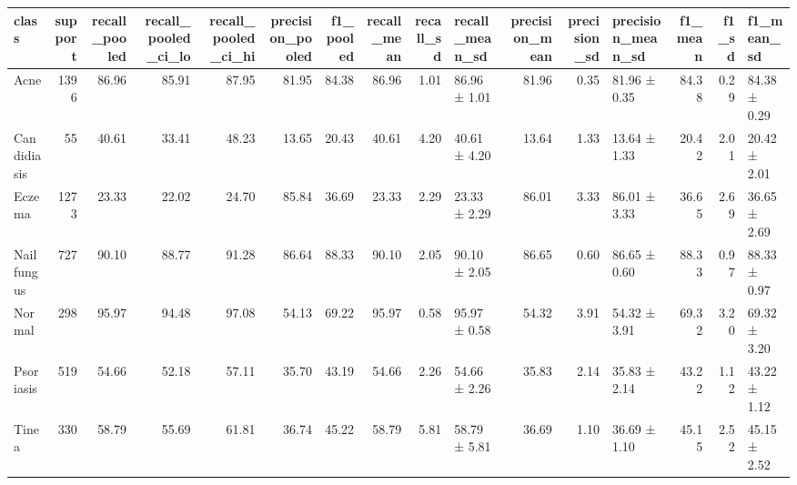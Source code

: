 \begin{tabular}{lrrrrrrrrlrrlrrl}
\toprule
class & support & recall\_pooled & recall\_pooled\_ci\_lo & recall\_pooled\_ci\_hi & precision\_pooled & f1\_pooled & recall\_mean & recall\_sd & recall\_mean\_sd & precision\_mean & precision\_sd & precision\_mean\_sd & f1\_mean & f1\_sd & f1\_mean\_sd \\
\midrule
Acne & 1396 & 86.96 & 85.91 & 87.95 & 81.95 & 84.38 & 86.96 & 1.01 & 86.96 ± 1.01 & 81.96 & 0.35 & 81.96 ± 0.35 & 84.38 & 0.29 & 84.38 ± 0.29 \\
Candidiasis & 55 & 40.61 & 33.41 & 48.23 & 13.65 & 20.43 & 40.61 & 4.20 & 40.61 ± 4.20 & 13.64 & 1.33 & 13.64 ± 1.33 & 20.42 & 2.01 & 20.42 ± 2.01 \\
Eczema & 1273 & 23.33 & 22.02 & 24.70 & 85.84 & 36.69 & 23.33 & 2.29 & 23.33 ± 2.29 & 86.01 & 3.33 & 86.01 ± 3.33 & 36.65 & 2.69 & 36.65 ± 2.69 \\
Nail fungus & 727 & 90.10 & 88.77 & 91.28 & 86.64 & 88.33 & 90.10 & 2.05 & 90.10 ± 2.05 & 86.65 & 0.60 & 86.65 ± 0.60 & 88.33 & 0.97 & 88.33 ± 0.97 \\
Normal & 298 & 95.97 & 94.48 & 97.08 & 54.13 & 69.22 & 95.97 & 0.58 & 95.97 ± 0.58 & 54.32 & 3.91 & 54.32 ± 3.91 & 69.32 & 3.20 & 69.32 ± 3.20 \\
Psoriasis & 519 & 54.66 & 52.18 & 57.11 & 35.70 & 43.19 & 54.66 & 2.26 & 54.66 ± 2.26 & 35.83 & 2.14 & 35.83 ± 2.14 & 43.22 & 1.12 & 43.22 ± 1.12 \\
Tinea & 330 & 58.79 & 55.69 & 61.81 & 36.74 & 45.22 & 58.79 & 5.81 & 58.79 ± 5.81 & 36.69 & 1.10 & 36.69 ± 1.10 & 45.15 & 2.52 & 45.15 ± 2.52 \\
\bottomrule
\end{tabular}
